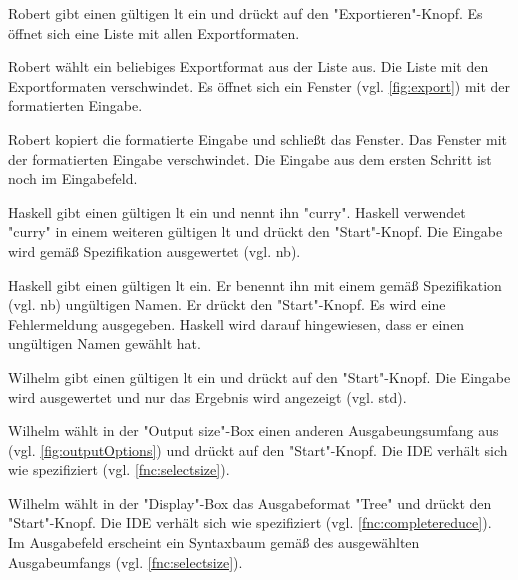 \documentclass[parskip=full,11pt,twoside]{scrartcl}
\begin{document}

{Robert gibt einen gültigen \gls{lt} ein und drückt auf den "Exportieren"-Knopf.}
{Es öffnet sich eine Liste mit allen Exportformaten.}

{Robert wählt ein beliebiges Exportformat aus der Liste aus.}
{Die Liste mit den Exportformaten verschwindet.
Es öffnet sich ein Fenster (vgl. \cref{fig:export}) mit der formatierten Eingabe.}

{Robert kopiert die formatierte Eingabe und schließt das Fenster.}
{Das Fenster mit der formatierten Eingabe verschwindet. 
 Die Eingabe aus dem ersten Schritt ist noch im Eingabefeld.}
 

{Haskell gibt einen gültigen \gls{lt} ein und nennt ihn "curry".
 Haskell verwendet "curry" in einem weiteren gültigen \gls{lt} und drückt den "Start"-Knopf.}
{Die Eingabe wird gemäß Spezifikation ausgewertet (vgl. \gls{nb}).}

{Haskell gibt einen gültigen \gls{lt} ein.
 Er benennt ihn mit einem gemäß Spezifikation (vgl. \gls{nb}) ungültigen Namen.
 Er drückt den "Start"-Knopf.}
{Es wird eine Fehlermeldung ausgegeben.
 Haskell wird darauf hingewiesen, dass er einen ungültigen Namen gewählt hat.}


{Wilhelm gibt einen gültigen \gls{lt} ein und drückt auf den "Start"-Knopf. }
{Die Eingabe wird ausgewertet und nur das Ergebnis wird angezeigt (vgl. \gls{std}).}

{Wilhelm wählt in der "Output size"-Box einen anderen Ausgabeungsumfang aus (vgl. \ref{fig:outputOptions}) und drückt auf den "Start"-Knopf.}
{Die IDE verhält sich wie spezifiziert (vgl. \ref{fnc:selectsize}).}

{Wilhelm wählt in der "Display"-Box das Ausgabeformat "Tree" und drückt den "Start"-Knopf.}
{Die IDE verhält sich wie spezifiziert (vgl. \ref{fnc:completereduce}).
 Im Ausgabefeld erscheint ein Syntaxbaum gemäß des ausgewählten Ausgabeumfangs (vgl. \ref{fnc:selectsize}).}
 
\end{document}
